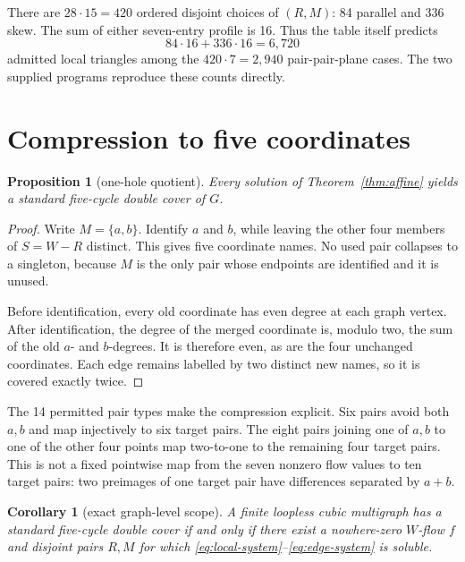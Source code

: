 \documentclass[11pt]{article}
\newtheorem{proposition}[theorem]{Proposition}
\newtheorem{corollary}[theorem]{Corollary}
\theoremstyle{definition}
\theoremstyle{remark}
\numberwithin{equation}{section}
\begin{document}
There are \(28\cdot15=420\) ordered disjoint choices of \((R,M)\):
84 parallel and 336 skew.  The sum of either seven-entry profile is 16.
Thus the table itself predicts
\[
               84\cdot16+336\cdot16=6{,}720
\]
admitted local triangles among the \(420\cdot7=2{,}940\)
pair-pair-plane cases.  The two supplied programs reproduce these counts
directly.

\section{Compression to five coordinates}

\begin{proposition}[one-hole quotient]
\label{prop:quotient}
Every solution of Theorem~\ref{thm:affine} yields a standard five-cycle
double cover of \(G\).
\end{proposition}

\begin{proof}
Write \(M=\{a,b\}\).  Identify \(a\) and \(b\), while leaving the other
four members of \(S=W-R\) distinct.  This gives five coordinate names.
No used pair collapses to a singleton, because \(M\) is the only pair
whose endpoints are identified and it is unused.

Before identification, every old coordinate has even degree at each
graph vertex.  After identification, the degree of the merged coordinate
is, modulo two, the sum of the old \(a\)- and \(b\)-degrees.  It is
therefore even, as are the four unchanged coordinates.  Each edge remains
labelled by two distinct new names, so it is covered exactly twice.
\end{proof}

The 14 permitted pair types make the compression explicit.  Six pairs
avoid both \(a,b\) and map injectively to six target pairs.  The eight
pairs joining one of \(a,b\) to one of the other four points map
two-to-one to the remaining four target pairs.  This is not a fixed
pointwise map from the seven nonzero flow values to ten target pairs:
two preimages of one target pair have differences separated by \(a+b\).

\begin{corollary}[exact graph-level scope]
\label{cor:equivalence}
A finite loopless cubic multigraph has a standard five-cycle double cover
if and only if there exist a nowhere-zero \(W\)-flow \(f\) and disjoint
pairs \(R,M\) for which
\eqref{eq:local-system}--\eqref{eq:edge-system} is soluble.
\end{corollary}
\end{document}
